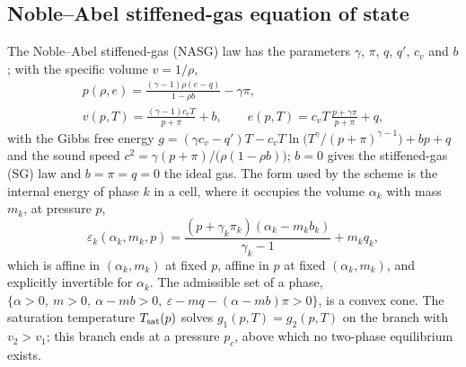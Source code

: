 \documentclass[a4paper,fleqn]{cas-sc}
\begin{document}
\subsection{Noble--Abel stiffened-gas equation of state}
\label{sec:nasg}
The Noble--Abel stiffened-gas (NASG) law \cite{LeMetayerSaurel2016} has the parameters $\gamma$, $\pi$, $q$, $q'$, $c_v$ and $b$; with the
specific volume $v=1/\rho$,
\begin{equation}
\begin{gathered}
p(\rho,e)=\frac{(\gamma-1)\rho(e-q)}{1-\rho b}-\gamma\pi,\\
v(p,T)=\frac{(\gamma-1)c_vT}{p+\pi}+b,\qquad e(p,T)=c_vT\,\frac{p+\gamma\pi}{p+\pi}+q,
\end{gathered}
\label{eq:nasg}
\end{equation}
with the Gibbs free energy $g=(\gamma c_v-q')T-c_vT\ln\big(T^\gamma/(p+\pi)^{\gamma-1}\big)+bp+q$ and the sound speed
$c^2=\gamma(p+\pi)/\big(\rho(1-\rho b)\big)$; $b=0$ gives the stiffened-gas (SG) law and $b=\pi=q=0$ the ideal gas. The form used by the
scheme is the internal energy of phase $k$ in a cell, where it occupies the volume $\alpha_k$ with mass $m_k$, at pressure $p$,
\begin{equation}
\varepsilon_k(\alpha_k,m_k,p)=\frac{(p+\gamma_k\pi_k)(\alpha_k-m_kb_k)}{\gamma_k-1}+m_kq_k ,
\label{eq:eps_nasg}
\end{equation}
which is affine in $(\alpha_k,m_k)$ at fixed $p$, affine in $p$ at fixed $(\alpha_k,m_k)$, and explicitly invertible for $\alpha_k$. The
admissible set of a phase, $\{\alpha>0,\ m>0,\ \alpha-mb>0,\ \varepsilon-mq-(\alpha-mb)\pi>0\}$, is a convex cone. The saturation
temperature $T_{\rm sat}(p)$ solves $g_1(p,T)=g_2(p,T)$ on the branch with $v_2>v_1$; this branch ends at a pressure $p_c$,
above which no two-phase equilibrium exists.
\end{document}
